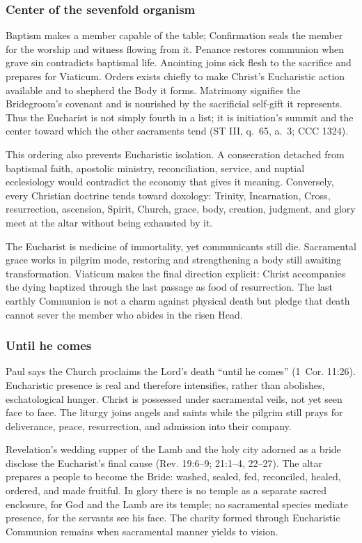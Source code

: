 \subsubsection{Center of the sevenfold organism}

Baptism makes a member capable of the table; Confirmation seals the member for the worship and witness flowing from it. Penance restores communion when grave sin contradicts baptismal life. Anointing joins sick flesh to the sacrifice and prepares for Viaticum. Orders exists chiefly to make Christ's Eucharistic action available and to shepherd the Body it forms. Matrimony signifies the Bridegroom's covenant and is nourished by the sacrificial self-gift it represents. Thus the Eucharist is not simply fourth in a list; it is initiation's summit and the center toward which the other sacraments tend (ST III, q.~65, a.~3; CCC 1324).

This ordering also prevents Eucharistic isolation. A consecration detached from baptismal faith, apostolic ministry, reconciliation, service, and nuptial ecclesiology would contradict the economy that gives it meaning. Conversely, every Christian doctrine tends toward doxology: Trinity, Incarnation, Cross, resurrection, ascension, Spirit, Church, grace, body, creation, judgment, and glory meet at the altar without being exhausted by it.

The Eucharist is medicine of immortality, yet communicants still die. Sacramental grace works in pilgrim mode, restoring and strengthening a body still awaiting transformation. Viaticum makes the final direction explicit: Christ accompanies the dying baptized through the last passage as food of resurrection. The last earthly Communion is not a charm against physical death but pledge that death cannot sever the member who abides in the risen Head.

\subsubsection{Until he comes}

Paul says the Church proclaims the Lord's death ``until he comes'' (1~Cor. 11:26). Eucharistic presence is real and therefore intensifies, rather than abolishes, eschatological hunger. Christ is possessed under sacramental veils, not yet seen face to face. The liturgy joins angels and saints while the pilgrim still prays for deliverance, peace, resurrection, and admission into their company.

Revelation's wedding supper of the Lamb and the holy city adorned as a bride disclose the Eucharist's final cause (Rev. 19:6--9; 21:1--4, 22--27). The altar prepares a people to become the Bride: washed, sealed, fed, reconciled, healed, ordered, and made fruitful. In glory there is no temple as a separate sacred enclosure, for God and the Lamb are its temple; no sacramental species mediate presence, for the servants see his face. The charity formed through Eucharistic Communion remains when sacramental manner yields to vision.

